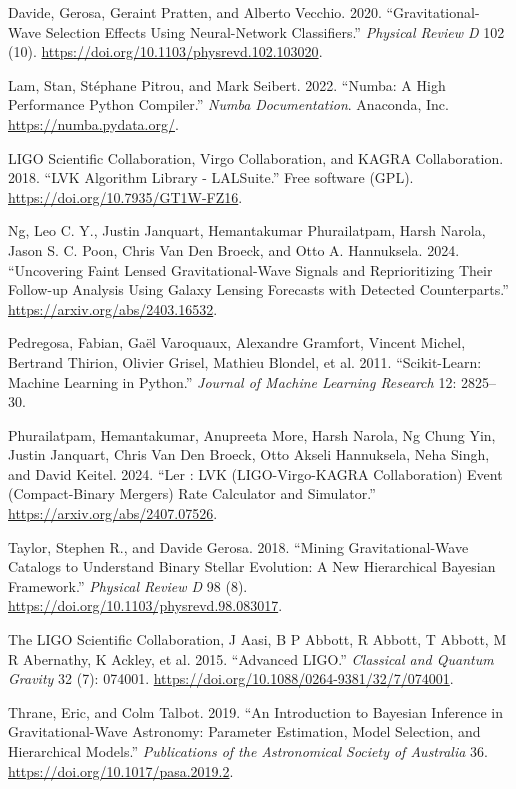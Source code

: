 \documentclass[10pt,a4paper,onecolumn]{article}
\newlength{\cslhangindent}
\newenvironment{CSLReferences}[3] %
 {%
  \setlength{\parindent}{0pt}
  \ifodd #1 \everypar{\setlength{\hangindent}{\cslhangindent}}\ignorespaces\fi
  \ifnum #2 > 0
  \setlength{\parskip}{#2\baselineskip}
  \fi
 }%
 {}
\begin{document}
\begin{CSLReferences}{1}{0}
\bibitem[\citeproctext]{ref-Gerosa:2020}
Davide, Gerosa, Geraint Pratten, and Alberto Vecchio. 2020.
{``Gravitational-Wave Selection Effects Using Neural-Network
Classifiers.''} \emph{Physical Review D} 102 (10).
\url{https://doi.org/10.1103/physrevd.102.103020}.

Lam, Stan, Stéphane Pitrou, and Mark Seibert. 2022. {``Numba: A High
Performance Python Compiler.''} \emph{Numba Documentation}. Anaconda,
Inc. \url{https://numba.pydata.org/}.

LIGO Scientific Collaboration, Virgo Collaboration, and KAGRA
Collaboration. 2018. {``{LVK} {A}lgorithm {L}ibrary - {LALS}uite.''}
Free software (GPL). \url{https://doi.org/10.7935/GT1W-FZ16}.

Ng, Leo C. Y., Justin Janquart, Hemantakumar Phurailatpam, Harsh Narola,
Jason S. C. Poon, Chris Van Den Broeck, and Otto A. Hannuksela. 2024.
{``Uncovering Faint Lensed Gravitational-Wave Signals and Reprioritizing
Their Follow-up Analysis Using Galaxy Lensing Forecasts with Detected
Counterparts.''} \url{https://arxiv.org/abs/2403.16532}.

Pedregosa, Fabian, Gaël Varoquaux, Alexandre Gramfort, Vincent Michel,
Bertrand Thirion, Olivier Grisel, Mathieu Blondel, et al. 2011.
{``Scikit-Learn: Machine Learning in {P}ython.''} \emph{Journal of
Machine Learning Research} 12: 2825--30.

Phurailatpam, Hemantakumar, Anupreeta More, Harsh Narola, Ng Chung Yin,
Justin Janquart, Chris Van Den Broeck, Otto Akseli Hannuksela, Neha
Singh, and David Keitel. 2024. {``Ler : LVK (LIGO-Virgo-KAGRA
Collaboration) Event (Compact-Binary Mergers) Rate Calculator and
Simulator.''} \url{https://arxiv.org/abs/2407.07526}.

Taylor, Stephen R., and Davide Gerosa. 2018. {``Mining
Gravitational-Wave Catalogs to Understand Binary Stellar Evolution: A
New Hierarchical Bayesian Framework.''} \emph{Physical Review D} 98 (8).
\url{https://doi.org/10.1103/physrevd.98.083017}.

The LIGO Scientific Collaboration, J Aasi, B P Abbott, R Abbott, T
Abbott, M R Abernathy, K Ackley, et al. 2015. {``Advanced LIGO.''}
\emph{Classical and Quantum Gravity} 32 (7): 074001.
\url{https://doi.org/10.1088/0264-9381/32/7/074001}.

Thrane, Eric, and Colm Talbot. 2019. {``An Introduction to Bayesian
Inference in Gravitational-Wave Astronomy: Parameter Estimation, Model
Selection, and Hierarchical Models.''} \emph{Publications of the
Astronomical Society of Australia} 36.
\url{https://doi.org/10.1017/pasa.2019.2}.

\end{CSLReferences}
\end{document}
